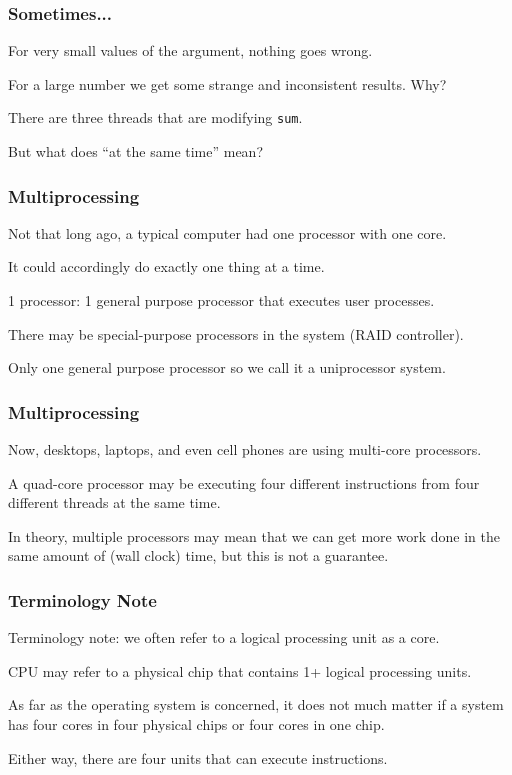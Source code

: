\begin{frame}
	\frametitle{Sometimes...}

	For very small values of the argument, nothing goes wrong.

	For a large number we get some strange and inconsistent results. Why?

	There are three threads that are modifying \texttt{sum}.

	But what does ``at the same time'' mean?

\end{frame}

\begin{frame}
	\frametitle{Multiprocessing}

	Not that long ago, a typical computer had one processor with one core.

	It could accordingly do exactly one thing at a time.

	1 processor: 1 general purpose processor that executes user processes.

	There may be special-purpose processors in the system (RAID controller).

	Only one general purpose processor so we call it a uniprocessor system.



\end{frame}


\begin{frame}
	\frametitle{Multiprocessing}

	Now, desktops, laptops, and even cell phones are using multi-core processors.

	A quad-core processor may be executing four different instructions from four different threads at the same time.

	In theory, multiple processors may mean that we can get more work done in the same amount of (wall clock) time, but this is not a guarantee.

\end{frame}


\begin{frame}
	\frametitle{Terminology Note}


	Terminology note: we often refer to a logical processing unit as a \alert{core}.

	CPU may refer to a physical chip that contains 1+ logical processing units.

	As far as the operating system is concerned, it does not much matter if a system has four cores in four physical chips or four cores in one chip.

	Either way, there are four units that can execute instructions.



\end{frame}



